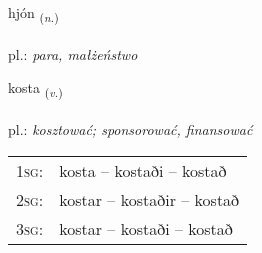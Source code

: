 \documentclass[frontgrid, backgrid]{flacards}\usepackage[]{graphicx}\usepackage[]{xcolor}
\begin{document}
\renewcommand{\flhead}{\vskip5pt \fboxsep=0pt {\small\bfseries\footnotesize Nafnorð | rzeczownik}}
\renewcommand{\fcfoot}{\vskip5pt \fboxsep=0pt \hspace{2pt}{\small\bfseries\footnotesize 1K}}

\renewcommand{\blhead}{\vskip5pt {\small\bfseries\footnotesize Nafnorð | rzeczownik }}
\renewcommand{\bcfoot}{\vskip5pt \hspace{2pt}{\small\bfseries\footnotesize 1K}}


{hjón \small{\textsubscript{(\textit{n.})}} \\[1ex] %
\textphonetic{[çouːn]} \\
pl.: \emph{para, małżeństwo} \\  [2ex]
\renewcommand*{\arraystretch}{0.8}
}

\renewcommand{\flhead}{\vskip5pt \fboxsep=0pt {\small\bfseries\footnotesize Sagnorð | czasownik}}
\renewcommand{\fcfoot}{\vskip5pt \fboxsep=0pt \hspace{2pt}{\small\bfseries\footnotesize 1K}}

\renewcommand{\blhead}{\vskip5pt {\small\bfseries\footnotesize Sagnorð | czasownik }}
\renewcommand{\bcfoot}{\vskip5pt \hspace{2pt}{\small\bfseries\footnotesize 1K}}


{kosta \small{\textsubscript{(\textit{v.})}} \\[1ex] %
\textphonetic{[kʰɔsta]} \\
pl.: \emph{kosztować; sponsorować, finansować} \\  [2ex]
\renewcommand*{\arraystretch}{0.8}
\begin{tabular}{p{1cm}l}
\textsc{1sg}: & kosta -- kostaði -- kostað \\ 
\textsc{2sg}: & kostar -- kostaðir -- kostað \\ 
\textsc{3sg}: & kostar -- kostaði -- kostað \\ 
\end{tabular}
}
\end{document}
